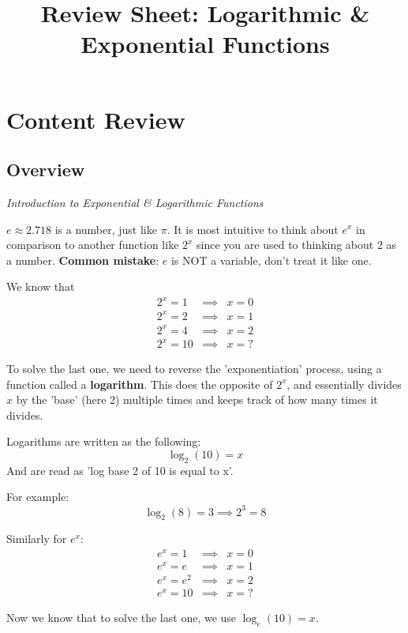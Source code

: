 \documentclass{article}
\title{Review Sheet: Logarithmic \& Exponential Functions}
\date{}
\author{}
\begin{document}
\maketitle
\vspace{-0.75in}
\section*{Content Review}
\subsection*{Overview}

\noindent \textit{Introduction to Exponential \& Logarithmic Functions}
\newline

$e \approx 2.718$ is a number, just like $\pi$. It is most intuitive to think about $e^x$ in comparison to another function like $2^x$ since you are used to thinking about 2 as a number. 
\noindent \newline \textbf{Common mistake}: $e$ is NOT a variable, don't treat it like one.

\noindent
We know that 
\begin{eqnarray*}
    2^x = 1 &\implies& x = 0 \\
    2^x = 2 &\implies& x = 1 \\
    2^x = 4 &\implies& x = 2 \\
    2^x = 10 &\implies& x = ?
\end{eqnarray*}

\noindent To solve the last one, we need to reverse the 'exponentiation' process, using a function called a \textbf{logarithm}. This does the opposite of $2^x$, and essentially divides $x$ by the 'base' (here 2) multiple times and keeps track of how many times it divides. 

\noindent Logarithms are written as the following:
$$\log_2(10) = x$$
And are read as 'log base 2 of 10 is equal to x'. 

\noindent For example: $$\log_2(8) = 3 \implies 2^3 = 8$$

\noindent Similarly for $e^x$: 
\begin{eqnarray*}
    e^x = 1 &\implies& x = 0 \\
    e^x = e &\implies& x = 1\\
    e^x = e^2 &\implies& x = 2 \\
    e^x = 10 &\implies& x = ?
\end{eqnarray*}

\noindent Now we know that to solve the last one, we use $\log_e(10) = x$.
\end{document}
